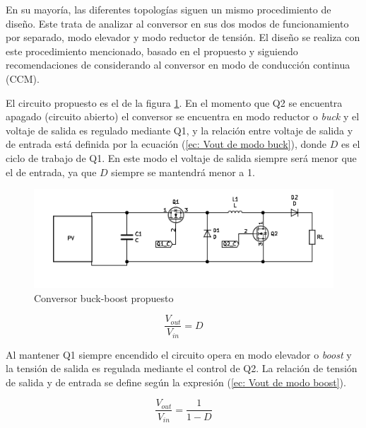        
    En su mayoría, las diferentes topologías siguen un mismo procedimiento de diseño. Este trata de analizar al  conversor en sus dos modos de funcionamiento por separado, modo elevador y modo reductor de tensión. El diseño se realiza con este procedimiento mencionado, basado en el propuesto \cite{espinosa2017asynchronous} y siguiendo recomendaciones de \cite{haifengdesign} considerando al conversor en modo de conducción continua (CCM). 
       
      
    El circuito propuesto es el de la figura \ref{fig: Esquematico BB }. En el momento que Q2 se encuentra apagado (circuito abierto) el conversor se encuentra en modo reductor o \textit{buck} y el voltaje de salida es regulado mediante Q1, y la relación entre voltaje de salida y de entrada está definida por la ecuación (\ref{ec: Vout de modo buck}), donde $D$ es el ciclo de trabajo de Q1. En este modo el voltaje de salida siempre será menor que el de entrada, ya que $D$ siempre se mantendrá menor a 1. 
       
       \begin{figure}[htbp]
            \centering
            \includegraphics[scale = 0.5]{Figuras/circuito_BB.png}
            \caption{Conversor buck-boost propuesto }
            \label{fig: Esquematico BB }
        \end{figure}
        
        \begin{equation}
            \frac{V_{out}}{V_{in}} = D 
            \label{ec: Vout de modo buck}
        \end{equation}
        
        Al mantener Q1 siempre encendido el circuito opera en modo elevador o \textit{boost} y la tensión de salida es regulada mediante el control de Q2. La relación de tensión de salida y de entrada se define según la expresión (\ref{ec: Vout de modo boost}).
        
        \begin{equation}
            \frac{V_{out}}{V_{in}} = \frac{1}{1 - D} 
            \label{ec: Vout de modo boost}
        \end{equation}
        
